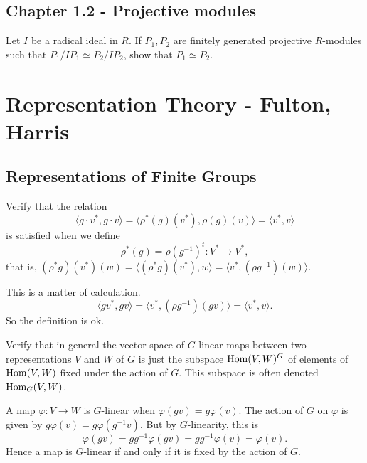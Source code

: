 \documentclass[11pt, english]{article}
\begin{document}
\subsection{Chapter 1.2 - Projective modules}

\begin{exc}
Let $I$ be a radical ideal in $R$. If $P_1,P_2$ are finitely generated projective $R$-modules such that $P_1/IP_1 \simeq P_2/IP_2$, show that $P_1 \simeq P_2$. 
\end{exc}

\begin{sol}
  
\end{sol}


\section{Representation Theory - Fulton, Harris}

\subsection{Representations of Finite Groups}

\begin{exc}[Exercise 1.1]
Verify that the relation 
\[
\langle g\cdot v^\ast , g \cdot v \rangle = \langle \rho^\ast(g)(v^\ast),\rho(g)(v) \rangle = \langle v^\ast, v\rangle 
\]
is satisfied when we define
\[
\rho^\ast(g) = \rho(g^{-1})^t :V^\ast \to V^\ast, 
\]
that is, $(\rho^\ast g)(v^\ast)(w)= \langle (\rho^\ast g)(v^\ast),w\rangle=\langle v^\ast, (\rho g^{-1})(w) \rangle$.
\end{exc}

\begin{sol}
This is a matter of calculation.
\[
\langle g v^\ast, gv \rangle = \langle v^\ast, (\rho g^{-1})(gv) \rangle = \langle v^\ast, v \rangle.
\]
So the definition is ok.
\end{sol}


\begin{exc}[Exercise 1.2]
Verify that in general the vector space of $G$-linear maps between two representations $V$ and $W$ of $G$ is just the subspace $\operatorname{Hom}(V,W)^G$ of elements of $\operatorname{Hom}(V,W)$ fixed under the action of $G$. This subspace is often denoted $\operatorname{Hom}_G(V,W)$.
\end{exc}
\begin{sol}	
A map $\varphi:V \to W$ is $G$-linear when $\varphi(gv)=g \varphi(v)$. The action of $G$ on $\varphi$ is given by $g\varphi(v)=g \varphi(g^{-1}v)$. But by $G$-linearity, this is
$$
\varphi(gv)=g g^{-1} \varphi(gv)=gg^{-1}\varphi(v)=\varphi(v).
$$
Hence a map is $G$-linear if and only if it is fixed by the action of $G$. 
\end{sol}
\end{document}
